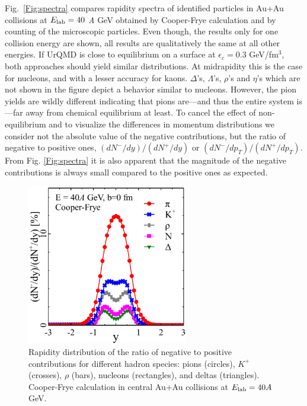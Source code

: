 Fig.~\ref{Fig:spectra} compares rapidity spectra of identified
particles in Au+Au collisions at $E_\mathrm{lab} = 40$ \emph{A} GeV obtained by
Cooper-Frye calculation and by counting of the microscopic
particles. Even though, the results only for one
collision energy are shown, all results are qualitatively the same at all other
energies. If UrQMD is close to equilibrium on a surface at
$\epsilon_c = 0.3$ GeV/fm$^3$, both approaches should yield similar
distributions. At midrapidity this is the case for nucleons, and with
a lesser accuracy for kaons. $\Delta$'s, $\Lambda$'s, $\rho$'s and
$\eta$'s which are not shown in the figure depict a behavior similar
to nucleons. However, the pion yields are wildly different indicating
that pions are---and thus the entire system is---far away from
chemical equilibrium at least. To cancel the effect of
non-equilibrium and to visualize the differences in momentum distributions
we consider not the absolute value of the negative
contributions, but the ratio of negative to positive ones,
$(dN^-/dy)/(dN^+/dy)$ or $(dN^-/dp_T)/(dN^+/dp_T)$. From
Fig. \ref{Fig:spectra} it is also apparent that the magnitude of the
negative contributions is always small compared to the positive ones
as expected.


\begin{figure}[htp]
\includegraphics[width=7cm]{plots/cooper_frye/neg_contr_mass.pdf}
\caption{ Rapidity distribution of the ratio of negative
  to positive contributions for different hadron species: pions
  (circles), $K^{+}$ (crosses), $\rho$ (bars), nucleons (rectangles),
  and deltas (triangles).  Cooper-Frye calculation in central Au+Au
  collisions at $E_\mathrm{lab} = 40A$ GeV.}
\label{Fig:neg_contr_pmass}
\end{figure}

